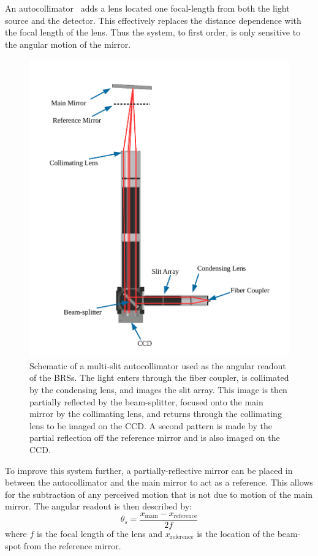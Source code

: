 \documentclass [12pt, proquest]{uwthesis}[2019]
\begin{document}
An autocollimator~\cite{MSA} adds a lens located one focal-length from both the light source and the detector. This effectively replaces the distance dependence with the focal length of the lens. Thus the system, to first order, is only sensitive to the angular motion of the mirror.

\begin{figure}%
\begin{center}
 \includegraphics[width=\textwidth]{Autocollimator2.pdf}
\caption[Schematic of a multi-slit autocollimator]{Schematic of a multi-slit autocollimator used as the angular readout of the BRSs. The light enters through the fiber coupler, is collimated by the condensing lens, and images the slit array. This image is then partially reflected by the beam-splitter, focused onto the main mirror by the collimating lens, and returns through the collimating lens to be imaged on the CCD. A second pattern is made by the partial reflection off the reference mirror and is also imaged on the CCD.}
\label{ACFig}
\end{center}
\end{figure}

To improve this system further, a partially-reflective mirror can be placed in between the autocollimator and the main mirror to act as a reference. This allows for the subtraction of any perceived motion that is not due to motion of the main mirror. The angular readout is then described by:
\begin{equation}
\theta_{s}=\frac{x_{\text{main}}-x_{\text{reference}}}{2f}
\label{ACEq}
\end{equation}
where $f$ is the focal length of the lens and $x_\text{reference}$ is the location of the beam-spot from the reference mirror.
\end{document}
